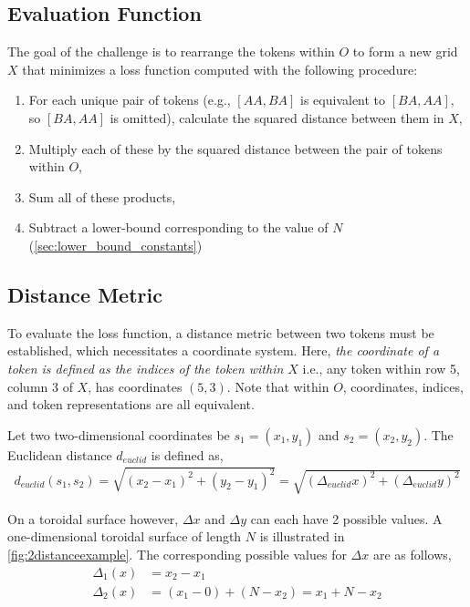\subsection{Evaluation Function}%
\label{sub:evaluation_function}

The goal of the challenge is to rearrange the tokens within $O$ to form a new grid $X$ that minimizes a loss function computed with the following procedure:
\begin{enumerate}
    \item For each unique pair of tokens (e.g., $[AA,BA]$ is equivalent to $[BA,AA]$, so $[BA,AA]$ is omitted), calculate the squared distance between them in $X$,
    \item Multiply each of these by the squared distance between the pair of tokens within $O$,
    \item Sum all of these products,
    \item Subtract a lower-bound corresponding to the value of $N$ (\autoref{sec:lower_bound_constants})
\end{enumerate}

\subsection{Distance Metric}%
\label{sub:distance_metric}
To evaluate the loss function, a distance metric between two tokens must be established, which necessitates a coordinate system. Here, \emph{the coordinate of a token is defined as the indices of the token within $X$} i.e., any token within row 5, column 3 of $X$, has coordinates $(5,3)$. Note that within $O$, coordinates, indices, and token representations are all equivalent.

 Let two two-dimensional coordinates be $s_1=(x_1,y_1)$ and $s_2=(x_2,y_2)$. The Euclidean distance $d_{euclid}$ is defined as,%
\begin{align}
    \label{eq:euclid}
    d_{euclid}(s_1,s_2)=\sqrt{(x_2-x_1)^2+(y_2-y_1)^2}=\sqrt{(\Delta_{euclid} x)^2+(\Delta_{euclid} y)^2}
\end{align}

On a toroidal surface however, $\Delta x$ and $\Delta y$ can each have 2 possible values. A one-dimensional toroidal surface of length $N$ is illustrated in \autoref{fig:2distanceexample}. The corresponding possible values for $\Delta x$ are as follows,%
\begin{align}
    \Delta_1(x)&=x_2-x_1\nonumber\\
    \Delta_2(x)&=(x_1-0)+(N-x_2)=x_1+N-x_2
    \label{eq:naiveToroidDistance}
\end{align}

